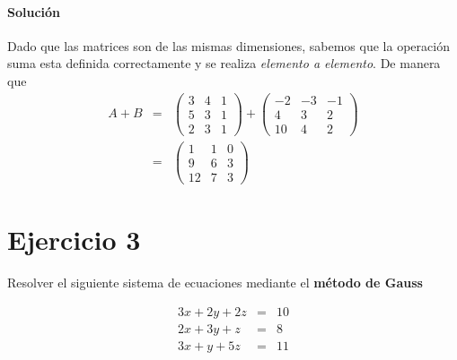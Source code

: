 \documentclass[12pt]{article}
\begin{document}
	\paragraph{Soluci\'on} Dado que las matrices son de las mismas dimensiones, sabemos que la operaci\'on suma esta definida correctamente y se realiza \textit{elemento a elemento}. De manera que
	\begin{eqnarray*}
		A + B &=& \begin{pmatrix} 
		    	3 & 4 & 1 \\ 5 & 3 & 1 \\ 2 & 3 & 1 
		    \end{pmatrix} +
		    \begin{pmatrix}
		   		-2 & -3 & -1 \\ 4 & 3 & 2 \\ 10 & 4 & 2
		    \end{pmatrix} \\
		    &=& \left(\begin{array}{rrr}
				1 & 1 & 0 \\
				9 & 6 & 3 \\
				12 & 7 & 3
			\end{array}\right)
	\end{eqnarray*}


\section*{Ejercicio 3}
	\par Resolver el siguiente sistema de ecuaciones mediante el \textbf{m\'etodo de Gauss}

    \begin{eqnarray*}
        3x + 2y + 2z &=& 10 \\
        2x + 3y +  z &=&  8 \\
        3x +  y + 5z &=& 11
    \end{eqnarray*}
    
\end{document}
